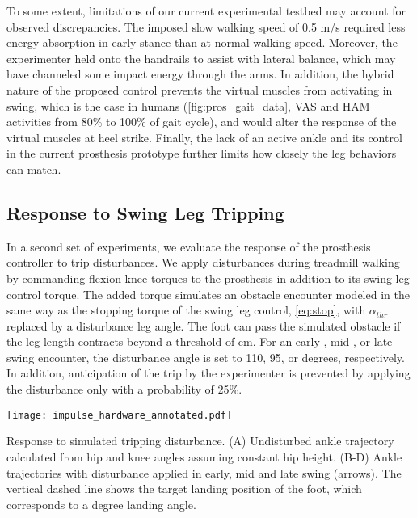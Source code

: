 To some extent, limitations of our current experimental testbed may
account for observed discrepancies. The imposed slow walking speed of 0.5 m/s
required less energy absorption in early stance than at normal walking speed.
Moreover, the experimenter held onto the handrails to assist with lateral
balance, which may have channeled some impact energy through the arms. In
addition, the hybrid nature of the proposed control prevents the virtual
muscles from activating in swing, which is the case in humans
(\cref{fig:pros_gait_data}, VAS and HAM activities from 80\% to 100\% of gait
cycle), and would alter the response of the virtual muscles at heel strike.
Finally, the lack of an active ankle and its control in the current prosthesis
prototype further limits how closely the leg behaviors can match.

\subsection{Response to Swing Leg Tripping}\label{sec:completed_exp_swing_trip}
 

In a second set of experiments, we evaluate the response of the prosthesis
controller to trip disturbances. We apply disturbances during treadmill walking
by commanding flexion knee torques to the prosthesis in addition to its
swing-leg control torque. The added torque simulates an obstacle encounter
modeled in the same way as the stopping torque of the swing leg control,
\cref{eq:stop}, with $\alpha_{thr}$ replaced by a disturbance leg angle. The
foot can pass the simulated obstacle if the leg length contracts beyond a
threshold of \unit[94]{cm}. For an early-, mid-, or late-swing encounter, the
disturbance angle is set to 110, 95, or \unit[80]{degrees}, respectively. In
addition, anticipation of the trip by the experimenter is prevented by applying
the disturbance only with a probability of 25\%.

\begin{marginfigure}[1in]
    \centering
    \texttt{[image: impulse\_hardware\_annotated.pdf]}
    \caption{Response to simulated tripping disturbance. (A) Undisturbed ankle
    trajectory calculated from hip and knee angles assuming constant hip height.
    (B-D) Ankle trajectories with disturbance applied in early, mid and late
    swing (arrows). The vertical dashed line shows the target landing position
    of the foot, which corresponds to a \unit[75]{degree} landing angle.}
    \label{fig:impulse_hardware}
\end{marginfigure}


